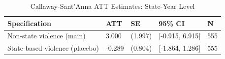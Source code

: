 \begin{table}[!h]
\centering
\caption{\label{tab:tab:cs_att}Callaway-Sant'Anna ATT Estimates: State-Year Level}
\centering
\begin{tabular}[t]{lllll}
\toprule
Specification & ATT & SE & 95\% CI & N\\
\midrule
Non-state violence (main) & 3.000 & (1.997) & {}[-0.915, 6.915] & 555\\
State-based violence (placebo) & -0.289 & (0.804) & {}[-1.864, 1.286] & 555\\
\bottomrule
\end{tabular}
\end{table}
